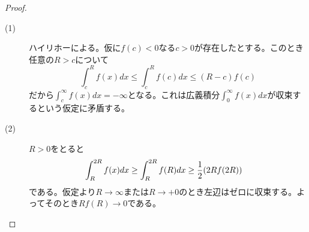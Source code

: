 \subsubsection{}%
\begin{proof} ${}$
  \begin{description}
    \item[(1)] ハイリホーによる。仮に$f(c) < 0$なる$c >0$が存在したとする。このとき任意の$R > c$について
    \[
    \int_c^R f(x) dx \leq \int_c^R f(c) dx \leq (R-c) f(c)
    \]
    だから$\int_c^{\infty} f(x) dx = - \infty$となる。これは広義積分$\int_0^{\infty} f(x) dx$が収束するという仮定に矛盾する。
    \item[(2)] $R > 0$をとると
    \begin{align*}
      \int_R^{2R} f(x) dx \geq \int_R^{2R} f(R) dx
      &\geq \frac{1}{2}( 2R f(2R) )
    \end{align*}
    である。仮定より$R \to \infty$または$R \to + 0$のとき左辺はゼロに収束する。よってそのとき$R f(R) \to 0$である。
  \end{description}
\end{proof}

\newpage

